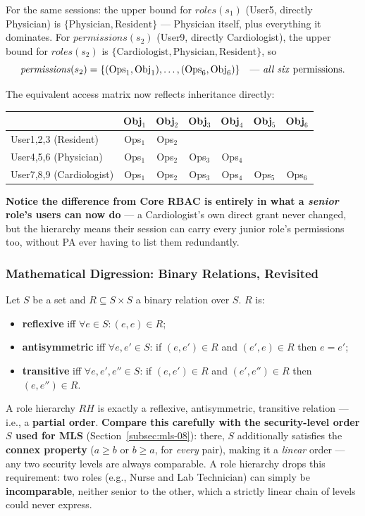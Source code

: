 \documentclass[12pt, a4paper]{article}
\begin{document}
For the same sessions: the upper bound for $\mathit{roles}(s_1)$ (User5, directly Physician) is $\{\text{Physician}, \text{Resident}\}$ --- Physician itself, plus everything it dominates. For $\mathit{permissions}(s_2)$ (User9, directly Cardiologist), the upper bound for $\mathit{roles}(s_2)$ is $\{\text{Cardiologist},\text{Physician},\text{Resident}\}$, so
\[
\mathit{permissions}(s_2) = \{(\text{Ops}_1,\text{Obj}_1),\dots,(\text{Ops}_6,\text{Obj}_6)\} \quad \text{--- \emph{all six} permissions.}
\]

The equivalent access matrix now reflects inheritance directly:
\begin{center}
\begin{tabular}{@{}lcccccc@{}}
\toprule
 & Obj$_1$ & Obj$_2$ & Obj$_3$ & Obj$_4$ & Obj$_5$ & Obj$_6$ \\
\midrule
User1,2,3 (Resident) & Ops$_1$ & Ops$_2$ & & & & \\
User4,5,6 (Physician) & Ops$_1$ & Ops$_2$ & Ops$_3$ & Ops$_4$ & & \\
User7,8,9 (Cardiologist) & Ops$_1$ & Ops$_2$ & Ops$_3$ & Ops$_4$ & Ops$_5$ & Ops$_6$ \\
\bottomrule
\end{tabular}
\end{center}
\textcolor{red!70!black}{\textbf{Notice the difference from Core RBAC is entirely in what a \emph{senior} role's users can now do}} --- a Cardiologist's own direct grant never changed, but the hierarchy means their session can carry every junior role's permissions too, without PA ever having to list them redundantly.

\subsubsection{Mathematical Digression: Binary Relations, Revisited}
Let $S$ be a set and $R \subseteq S \times S$ a binary relation over $S$. $R$ is:
\begin{itemize}
    \item \textbf{reflexive} iff $\forall e \in S: (e,e) \in R$;
    \item \textbf{antisymmetric} iff $\forall e,e' \in S$: if $(e,e')\in R$ and $(e',e)\in R$ then $e=e'$;
    \item \textbf{transitive} iff $\forall e,e',e'' \in S$: if $(e,e')\in R$ and $(e',e'')\in R$ then $(e,e'')\in R$.
\end{itemize}
A role hierarchy $RH$ is exactly a reflexive, antisymmetric, transitive relation --- i.e., a \textbf{partial order}. \textcolor{blue!50!black}{\textbf{Compare this carefully with the security-level order $S$ used for MLS}} (Section~\ref{subsec:mls-08}): there, $S$ additionally satisfies the \textbf{connex property} ($a\geq b$ or $b\geq a$, for \emph{every} pair), making it a \emph{linear} order --- any two security levels are always comparable. A role hierarchy drops this requirement: two roles (e.g., Nurse and Lab Technician) can simply be \textbf{incomparable}, neither senior to the other, which a strictly linear chain of levels could never express.
\end{document}
